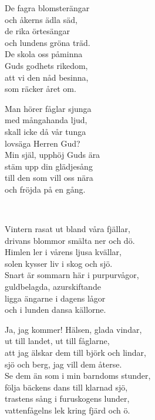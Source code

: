De fagra blomsterängar\\
och åkerns ädla säd,\\
de rika örtesängar\\
och lundens gröna träd.\\
De skola oss påminna\\
Guds godhets rikedom,\\
att vi den nåd besinna,\\
som räcker året om.

Man hörer fåglar sjunga\\
med mångahanda ljud,\\
skall icke då vår tunga\\
lovsäga Herren Gud?\\
Min själ, upphöj Guds ära\\
stäm upp din glädjesång\\
till den som vill oss nära\\
och fröjda på en gång. 



 \\
\author{Text: Herman Sätherberg}

\songtext{}Vintern rasat ut bland våra fjällar,\\
drivans blommor smälta ner och dö.\\
Himlen ler i vårens ljusa kvällar,\\
solen kysser liv i skog och sjö.\\
Snart är sommarn här i purpurvågor,\\
guldbelagda, azurskiftande\\
ligga ängarne i dagens lågor\\
och i lunden dansa källorne.

Ja, jag kommer! Hälsen, glada vindar,\\
ut till landet, ut till fåglarne,\\
att jag älskar dem till björk och lindar,\\
sjö och berg, jag vill dem återse.\\
Se dem än som i min barndoms stunder,\\
följa bäckens dans till klarnad sjö,\\
trastens sång i furuskogens lunder,\\
vattenfågelns lek kring fjärd och ö.

